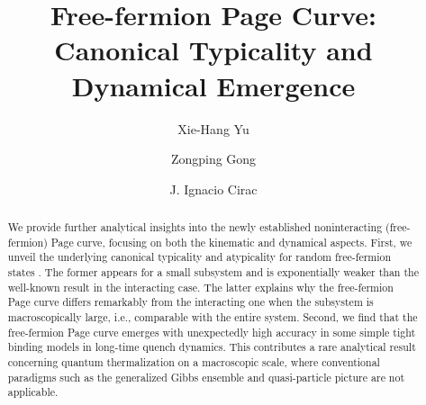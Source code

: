 \documentclass[twocolumn,english,prl,aps,superscriptaddress,amsmath,amssymb,floatfix]{revtex4-2}
\begin{document}
\title{Free-fermion %
Page Curve: Canonical Typicality and Dynamical Emergence}
\author{Xie-Hang Yu}
\author{Zongping Gong}
\author{J. Ignacio Cirac}
\begin{abstract}
We provide further analytical insights into the newly established noninteracting (free-fermion) Page curve, focusing on both the kinematic and dynamical aspects. First, we unveil the underlying canonical typicality and atypicality for random free-fermion states%
. The former appears for a small subsystem and is exponentially weaker than the well-known result in the interacting case. The latter explains why the free-fermion Page curve differs remarkably from the interacting one when the subsystem is macroscopically large, i.e., comparable with the entire system. Second, we find that the free-fermion Page curve emerges with unexpectedly high accuracy in some simple tight binding %
models in long-time quench dynamics. This contributes a rare analytical result concerning quantum thermalization on a macroscopic scale, where conventional paradigms such as the generalized Gibbs ensemble and quasi-particle picture are not applicable. %
\begin{comment}
The random fermionic Gaussian(RFG) ensemble is %
\textcolor{red}{widely used} %
to illustrate many physical concepts, such as thermalization and entanglement
entropy. Our work first studies the ergodicity of these ensemble and
prove the canonical typicality. We found that the thermalization rate

\end{comment}
\end{abstract}
\end{document}

